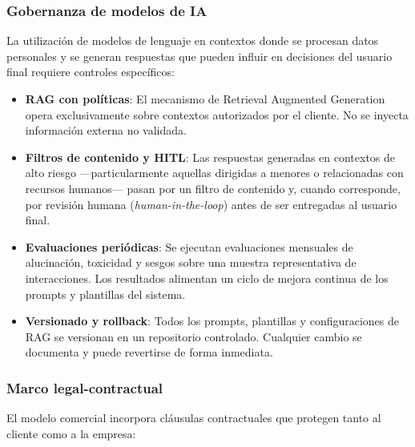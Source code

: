 \subsubsection{Gobernanza de modelos de IA}

La utilización de modelos de lenguaje en contextos donde se procesan datos personales y se generan respuestas que pueden influir en decisiones del usuario final requiere controles específicos:

\begin{itemize}
    \item \textbf{RAG con políticas}: El mecanismo de Retrieval Augmented Generation opera exclusivamente sobre contextos autorizados por el cliente. No se inyecta información externa no validada.
    \item \textbf{Filtros de contenido y HITL}: Las respuestas generadas en contextos de alto riesgo —particularmente aquellas dirigidas a menores o relacionadas con recursos humanos— pasan por un filtro de contenido y, cuando corresponde, por revisión humana (\textit{human-in-the-loop}) antes de ser entregadas al usuario final.
    \item \textbf{Evaluaciones periódicas}: Se ejecutan evaluaciones mensuales de alucinación, toxicidad y sesgos sobre una muestra representativa de interacciones. Los resultados alimentan un ciclo de mejora continua de los prompts y plantillas del sistema.
    \item \textbf{Versionado y rollback}: Todos los prompts, plantillas y configuraciones de RAG se versionan en un repositorio controlado. Cualquier cambio se documenta y puede revertirse de forma inmediata.
\end{itemize}

\subsubsection{Marco legal-contractual}

El modelo comercial incorpora cláusulas contractuales que protegen tanto al cliente como a la empresa:

